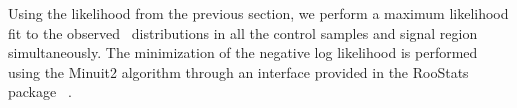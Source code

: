 Using the likelihood from the previous section, we perform a maximum likelihood fit to the observed \ETg\ distributions in all the control samples and signal region simultaneously.
The minimization of the negative log likelihood is performed using the Minuit2 algorithm through an interface provided in the RooStats package ~\cite{RooStats2010}.

\begin{figure}[htbp]
  \centering
\end{figure}
